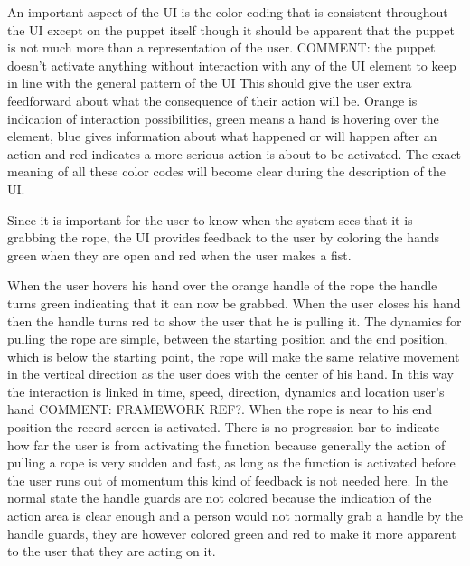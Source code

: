 An important aspect of the UI is the color coding that is consistent throughout the UI except on the puppet itself though it should be apparent that the puppet is not much more than a representation of the user. {\large COMMENT: the puppet doesn't activate anything without interaction with any of the UI element to keep in line with the general pattern of the UI} This should give the user extra feedforward about what the consequence of their action will be. Orange is indication of interaction possibilities, green means a hand is hovering over the element, blue gives information about what happened or will happen after an action and red indicates a more serious action is about to be activated. The exact meaning of all these color codes will become clear during the description of the UI.

Since it is important for the user to know when the system sees that it is grabbing the rope, the UI provides feedback to the user by coloring the hands green when they are open and red when the user makes a fist.

When the user hovers his hand over the orange handle of the rope the handle turns green indicating that it can now be grabbed. When the user closes his hand then the handle turns red to show the user that he is pulling it. The dynamics for pulling the rope are simple, between the starting position and the end position, which is below the starting point, the rope will make the same relative movement in the vertical direction as the user does with the center of his hand. In this way the interaction is linked in time, speed, direction, dynamics and location user's hand {\large COMMENT: FRAMEWORK REF?}. When the rope is near to his end position the record screen is activated. There is no progression bar to indicate how far the user is from activating the function because generally the action of pulling a rope is very sudden and fast, as long as the function is activated before the user runs out of momentum this kind of feedback is not needed here. In the normal state the handle guards are not colored because the indication of the action area is clear enough and a person would not normally grab a handle by the handle guards, they are however colored green and red to make it more apparent to the user that they are acting on it. 

